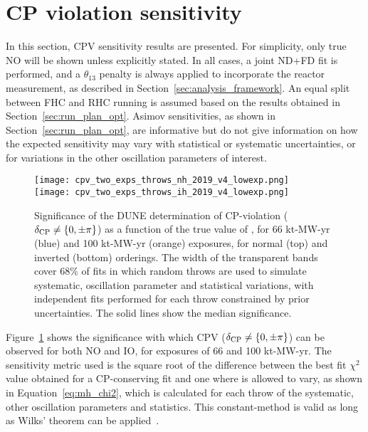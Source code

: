 \FloatBarrier
\section{CP violation sensitivity}
\label{sec:cp_sens}

In this section, CPV sensitivity results are presented. For simplicity, only true NO will be shown unless explicitly stated. In all cases, a joint ND+FD fit is performed, and a $\theta_{13}$ penalty is always applied to incorporate the reactor measurement, as described in Section~\ref{sec:analysis_framework}. An equal split between FHC and RHC running is assumed based on the results obtained in Section~\ref{sec:run_plan_opt}. Asimov sensitivities, as shown in Section~\ref{sec:run_plan_opt}, are informative but do not give information on how the expected sensitivity may vary with statistical or systematic uncertainties, or for variations in the other oscillation parameters of interest.

\begin{figure}[htbp]
  \centering
  \texttt{[image: cpv\_two\_exps\_throws\_nh\_2019\_v4\_lowexp.png]}\\
  \texttt{[image: cpv\_two\_exps\_throws\_ih\_2019\_v4\_lowexp.png]}
  \caption{Significance of the DUNE determination of CP-violation ($\delta_{\rm CP} \neq \{0,\pm\pi\}$) as a function of the true value of \deltacp, for 66 kt-MW-yr (blue) and 100 kt-MW-yr (orange) exposures, for normal (top) and inverted (bottom) orderings. The width of the transparent bands cover 68\% of fits in which random throws are used to simulate systematic, oscillation parameter and statistical variations, with independent fits performed for each throw constrained by prior uncertainties. The solid lines show the median significance.}
  \label{fig:cpv_bands}
\end{figure}
Figure~\ref{fig:cpv_bands} shows the significance with which CPV ($\delta_{\rm CP} \neq \{0,\pm\pi\}$) can be observed for both NO and IO, for exposures of 66 and 100 kt-MW-yr.  The sensitivity metric used is the square root of the difference between the best fit $\chi^{2}$ value obtained for a CP-conserving fit and one where \deltacp is allowed to vary, as shown in Equation~\ref{eq:mh_chi2}, which is calculated for each throw of the systematic, other oscillation parameters and statistics. This constant-\dchisq method is valid as long as Wilks' theorem can be applied~\cite{wilks}.

